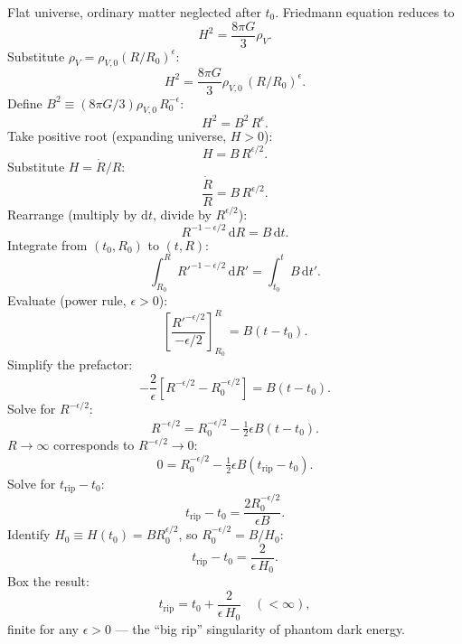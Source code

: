 \documentclass[11pt]{article}
\newcommand{\de}{\mathrm{d}}
\begin{document}
Flat universe, ordinary matter neglected after $t_0$. Friedmann equation reduces to
\[
H^2 = \frac{8\pi G}{3}\rho_V.
\]
Substitute $\rho_V = \rho_{V,0}(R/R_0)^\epsilon$:
\[
H^2 = \frac{8\pi G}{3}\rho_{V,0}\,(R/R_0)^\epsilon.
\]
Define $B^2 \equiv (8\pi G/3)\rho_{V,0}\,R_0^{-\epsilon}$:
\[
H^2 = B^2\,R^\epsilon.
\]
Take positive root (expanding universe, $H>0$):
\[
H = B\,R^{\epsilon/2}.
\]
Substitute $H = \dot R/R$:
\[
\frac{\dot R}{R} = B\,R^{\epsilon/2}.
\]
Rearrange (multiply by $\de t$, divide by $R^{\epsilon/2}$):
\[
R^{-1-\epsilon/2}\,\de R = B\,\de t.
\]
Integrate from $(t_0, R_0)$ to $(t, R)$:
\[
\int_{R_0}^{R} R'^{-1-\epsilon/2}\,\de R' = \int_{t_0}^{t}B\,\de t'.
\]
Evaluate (power rule, $\epsilon>0$):
\[
\left[\frac{R'^{-\epsilon/2}}{-\epsilon/2}\right]_{R_0}^{R} = B(t-t_0).
\]
Simplify the prefactor:
\[
-\frac{2}{\epsilon}\!\left[R^{-\epsilon/2} - R_0^{-\epsilon/2}\right] = B(t - t_0).
\]
Solve for $R^{-\epsilon/2}$:
\[
R^{-\epsilon/2} = R_0^{-\epsilon/2} - \tfrac{1}{2}\epsilon B(t - t_0).
\]
$R\to\infty$ corresponds to $R^{-\epsilon/2}\to 0$:
\[
0 = R_0^{-\epsilon/2} - \tfrac{1}{2}\epsilon B(t_{\mathrm{rip}}-t_0).
\]
Solve for $t_{\mathrm{rip}}-t_0$:
\[
t_{\mathrm{rip}} - t_0 = \frac{2 R_0^{-\epsilon/2}}{\epsilon B}.
\]
Identify $H_0 \equiv H(t_0) = B R_0^{\epsilon/2}$, so $R_0^{-\epsilon/2} = B/H_0$:
\[
t_{\mathrm{rip}} - t_0 = \frac{2}{\epsilon\,H_0}.
\]
Box the result:
\[
\boxed{\;t_{\mathrm{rip}} = t_0 + \frac{2}{\epsilon\,H_0}\quad(<\infty),\;}
\]
finite for any $\epsilon > 0$ --- the ``big rip'' singularity of phantom dark energy.
\end{document}
